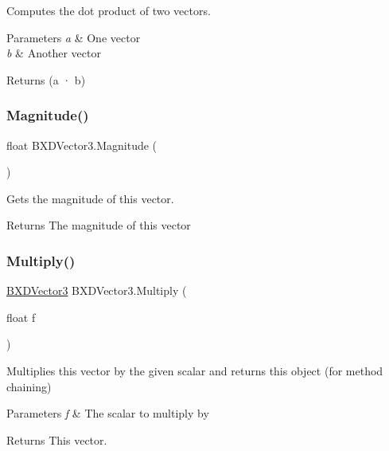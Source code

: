 Computes the dot product of two vectors. 


\begin{DoxyParams}{Parameters}
{\em a} & One vector\\
\hline
{\em b} & Another vector\\
\hline
\end{DoxyParams}
\begin{DoxyReturn}{Returns}
(a · b)
\end{DoxyReturn}
\mbox{\label{class_b_x_d_vector3_a3db16bd642a330d6ba53175aadcf28bd}} 
\subsubsection{\texorpdfstring{Magnitude()}{Magnitude()}}
{\footnotesize\ttfamily float B\+X\+D\+Vector3.\+Magnitude (\begin{DoxyParamCaption}{ }\end{DoxyParamCaption})}



Gets the magnitude of this vector. 

\begin{DoxyReturn}{Returns}
The magnitude of this vector
\end{DoxyReturn}
\mbox{\label{class_b_x_d_vector3_a4fa123abdf042e9116c3c231b61c8668}} 
\subsubsection{\texorpdfstring{Multiply()}{Multiply()}}
{\footnotesize\ttfamily \hyperlink{class_b_x_d_vector3}{B\+X\+D\+Vector3} B\+X\+D\+Vector3.\+Multiply (\begin{DoxyParamCaption}\item[{float}]{f }\end{DoxyParamCaption})}



Multiplies this vector by the given scalar and returns this object (for method chaining) 


\begin{DoxyParams}{Parameters}
{\em f} & The scalar to multiply by\\
\hline
\end{DoxyParams}
\begin{DoxyReturn}{Returns}
This vector.
\end{DoxyReturn}
\mbox{\label{class_b_x_d_vector3_abe5605287cb9f1fde60e6c1f4f3c0245}} 
